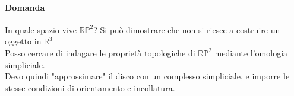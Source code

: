 \documentclass[a4paper]{report}
\newcommand{\R}{\ensuremath{\mathbb{R}}}
\newcommand{\RP}[1]{\ensuremath{\mathbb{RP}^{#1}}}
\begin{document}
\begin{center}

\end{center}
\paragraph{Domanda} In quale spazio vive $\RP{2}$? Si può dimostrare che non si riesce a costruire un oggetto in $\R^3$\\
Posso cercare di indagare le proprietà topologiche di $\RP{2}$ mediante l'omologia simpliciale.\\
Devo quindi "approssimare" il disco con un complesso simpliciale, e imporre le stesse condizioni di orientamento e incollatura.\\
\end{document}
